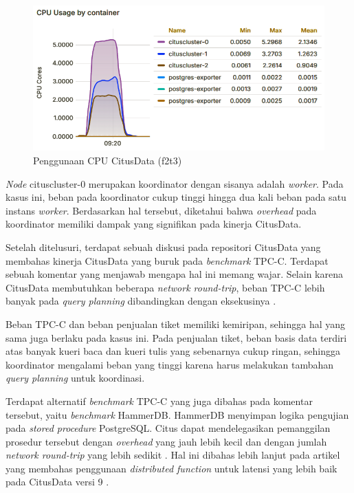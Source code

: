 \begin{figure}[H]
    \centering
    \includegraphics[width=1\textwidth]{resources/chapter-4/citusdata-usage.png}
    \caption{Penggunaan CPU CitusData (f2t3)}
    \label{fig:citusdata-usage}
\end{figure}

\textit{Node} cituscluster-0 merupakan koordinator dengan sisanya adalah \textit{worker}. Pada kasus ini, beban pada koordinator cukup tinggi hingga dua kali beban pada satu instans \textit{worker}. Berdasarkan hal tersebut, diketahui bahwa \textit{overhead} pada koordinator memiliki dampak yang signifikan pada kinerja CitusData.

Setelah ditelusuri, terdapat sebuah diskusi pada repositori CitusData yang membahas kinerja CitusData yang buruk pada \textit{benchmark} TPC-C. Terdapat sebuah komentar yang menjawab mengapa hal ini memang wajar. Selain karena CitusData membutuhkan beberapa \textit{network round-trip}, beban TPC-C lebih banyak pada \textit{query planning} dibandingkan dengan eksekusinya \parencite{Slot2020}.

Beban TPC-C dan beban penjualan tiket memiliki kemiripan, sehingga hal yang sama juga berlaku pada kasus ini. Pada penjualan tiket, beban basis data terdiri atas banyak kueri baca dan kueri tulis yang sebenarnya cukup ringan, sehingga koordinator mengalami beban yang tinggi karena harus melakukan tambahan \textit{query planning} untuk koordinasi.

Terdapat alternatif \textit{benchmark} TPC-C yang juga dibahas pada komentar tersebut, yaitu \textit{benchmark} HammerDB. HammerDB menyimpan logika pengujian pada \textit{stored procedure} PostgreSQL. Citus dapat mendelegasikan pemanggilan prosedur tersebut dengan \textit{overhead} yang jauh lebih kecil dan dengan jumlah \textit{network round-trip} yang lebih sedikit \parencite{Slot2020}. Hal ini dibahas lebih lanjut pada artikel yang membahas penggunaan \textit{distributed function} untuk latensi yang lebih baik pada CitusData versi 9 \parencite{Slot2020faster}.

